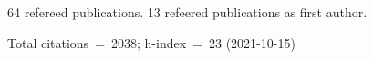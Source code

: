 64 refereed publications. 13 refeered publications as first author.

Total citations~=~2038; h-index~=~23 (2021-10-15)